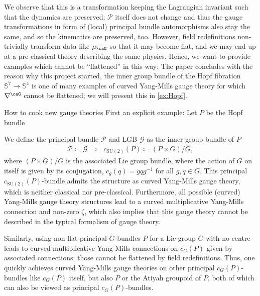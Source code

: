 \documentclass[reqno,a4paper,oneside]{amsart}
\newcommand\mutot{\mu_\caG}
\theoremstyle{plain}
\theoremstyle{remark}
\theoremstyle{definition}
\begin{document}
We observe that this is a transformation keeping the Lagrangian invariant such that the dynamics are preserved; $\mathcal{P}$ itself does not change and thus the gauge transformations in form of (local) principal bundle automorphisms also stay the same, and so the kinematics are preserved, too. However, field redefinitions non-trivially transform data like $\mutot$ so that it may become flat, and we may end up at a pre-classical theory describing the same physics. Hence, we want to provide examples which cannot be ``flattened'' in this way: The paper concludes with the reason why this project started, the inner group bundle of the Hopf fibration $\mathbb{S}^7 \to \mathbb{S}^4$ is one of many examples of curved Yang-Mills gauge theory for which $\nabla^\caG$ cannot be flattened; we will present this in \ref{ex:Hopf}.

\begin{examples*}{How to cook new gauge theories}
First an explicit example: Let $P$ be the Hopf bundle
\begin{center}
\end{center}
We define the principal bundle $\mathcal{P}$ and LGB $\mathcal{G}$ as the inner group bundle of $P$
\begin{align*}
\mathcal{P}
\coloneqq
\mathcal{G}
&\coloneqq
c_{\mathrm{SU}(2)}(P)
\coloneqq 
(P\times G) \Big/ G,
\end{align*}
where $(P\times G) / G$ is the associated Lie group bundle, where the action of $G$ on itself is given by its conjugation, $c_g(q) = gqg^{-1}$ for all $g, q \in G$. This principal $c_{\mathrm{SU}(2)}(P)$-bundle admits the structure as curved Yang-Mills gauge theory, which is neither classical nor pre-classical. Furthermore, all possible (curved) Yang-Mills gauge theory structures lead to a curved multiplicative Yang-Mills connection and non-zero $\zeta$, which also implies that this gauge theory cannot be described in the typical formalism of gauge theory.

Similarly, using non-flat principal $G$-bundles $P$ for a Lie group $G$ with no centre leads to curved multiplicative Yang-Mills connections on $c_G(P)$ given by associated connections; those cannot be flattened by field redefinitions. Thus, one quickly achieves curved Yang-Mills gauge theories on other principal $c_G(P)$-bundles like $c_G(P)$ itself, but also $P$ or the Atiyah groupoid of $P$, both of which can also be viewed as principal $c_G(P)$-bundles.
\end{examples*}
\end{document}
